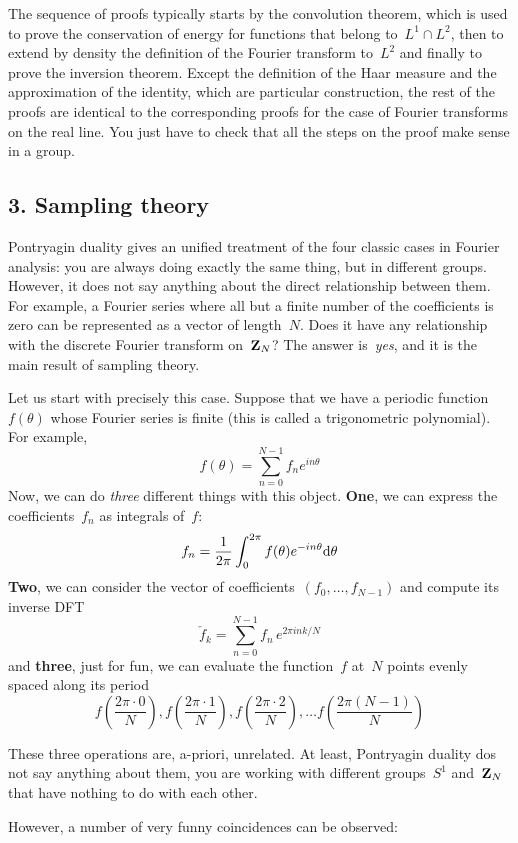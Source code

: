 The sequence of proofs typically starts by the convolution theorem,
which is used to prove the conservation of energy for functions that
belong to~$L^1\cap L^2$, then to extend by density the definition of
the Fourier transform to~$L^2$ and finally to prove the inversion
theorem.  Except the definition of the Haar measure and the
approximation of the identity, which are particular construction, the
rest of the proofs are identical to the corresponding proofs for the
case of Fourier transforms on the real line.  You just have to check
that all the steps on the proof make sense in a group.


\subsection{3. Sampling theory}

Pontryagin duality gives an unified treatment of the four classic
cases in Fourier analysis: you are always doing exactly the same
thing, but in different groups.  However, it does not say anything
about the direct relationship between them.  For example, a Fourier
series where all but a finite number of the coefficients is zero can
be represented as a vector of length~$N$.  Does it have any
relationship with the discrete Fourier transform on~$\mathbf{Z}_N$?  The
answer is~\emph{yes}, and it is the main result of sampling theory.

Let us start with precisely this case.  Suppose that we have a
periodic function~$f(\theta)$ whose Fourier series is finite (this is
called a trigonometric polynomial).  For
example,
$$
f(\theta)=\sum_{n=0}^{N-1} f_ne ^{in\theta}
$$
Now, we can do \emph{three} different things with this object.  {\bf
One}, we can express the coefficients~$f_n$ as integrals of~$f$:
$$
f_n = \frac{1}{2\pi}\int_0^{2\pi} f(\theta)e^{-in\theta}\mathrm{d}\theta
$$
{\bf Two}, we can consider the vector of
coefficients~$(f_0,\ldots,f_{N-1})$ and compute its inverse DFT
$$
\check{f}_k = \sum_{n=0}^{N-1} f_n\,e^{2\pi i nk/N}
$$
and {\bf three}, just for fun, we can evaluate the function~$f$
at~$N$ points evenly spaced along its period
$$
f\left(\frac{2\pi\cdot 0}{N}\right),
f\left(\frac{2\pi\cdot 1}{N}\right),
f\left(\frac{2\pi\cdot 2}{N}\right),
\ldots
f\left(\frac{2\pi(N-1)}{N}\right)
$$

These three operations are, a-priori, unrelated.  At least,
Pontryagin duality dos not say anything about them, you are
working with different groups~$S^1$ and~$\mathbf{Z}_N$ that have nothing to
do with each other.

However, a number of very funny coincidences can be observed:

